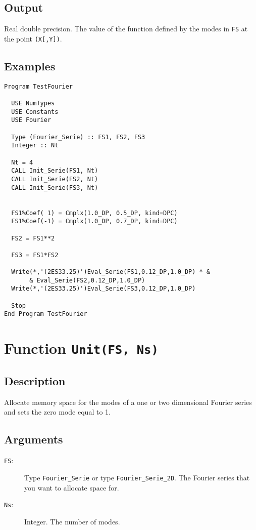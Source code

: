 \subsection{Output}

Real double precision. The value of the function defined by the modes
in \texttt{FS} at the point \texttt{(X[,Y])}.

\subsection{Examples}

\begin{verbatim}
Program TestFourier

  USE NumTypes
  USE Constants
  USE Fourier

  Type (Fourier_Serie) :: FS1, FS2, FS3
  Integer :: Nt

  Nt = 4
  CALL Init_Serie(FS1, Nt)
  CALL Init_Serie(FS2, Nt)
  CALL Init_Serie(FS3, Nt)


  FS1%Coef( 1) = Cmplx(1.0_DP, 0.5_DP, kind=DPC)
  FS1%Coef(-1) = Cmplx(1.0_DP, 0.7_DP, kind=DPC)

  FS2 = FS1**2

  FS3 = FS1*FS2

  Write(*,'(2ES33.25)')Eval_Serie(FS1,0.12_DP,1.0_DP) * &
       & Eval_Serie(FS2,0.12_DP,1.0_DP)
  Write(*,'(2ES33.25)')Eval_Serie(FS3,0.12_DP,1.0_DP)

  Stop
End Program TestFourier
\end{verbatim}


\section{Function \texttt{Unit(FS, Ns)}}

\subsection{Description}

Allocate memory space for the modes of a one or two dimensional
Fourier series and sets the zero mode equal to 1.

\subsection{Arguments}

\begin{description}
\item[\texttt{FS}:] Type \texttt{Fourier\_Serie} or type
  \texttt{Fourier\_Serie\_2D}. The Fourier series that you want
  to allocate space for.
\item[\texttt{Ns}:] Integer. The number of modes.
\end{description}

